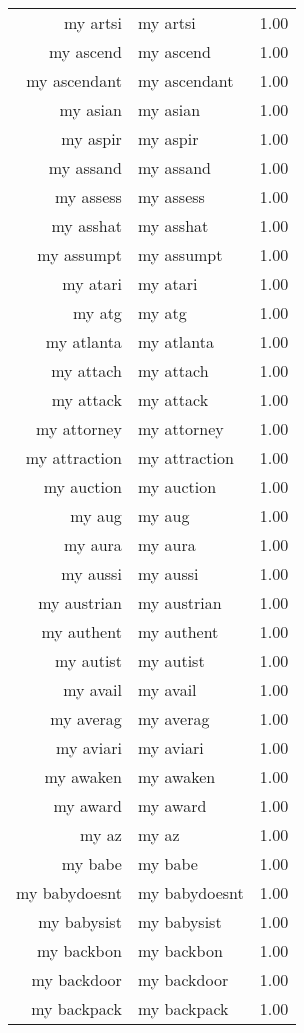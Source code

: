\begin{table}[ht]
\begin{tabular}{rlr}
  my artsi & my artsi & 1.00 \\ 
  my ascend & my ascend & 1.00 \\ 
  my ascendant & my ascendant & 1.00 \\ 
  my asian & my asian & 1.00 \\ 
  my aspir & my aspir & 1.00 \\ 
  my assand & my assand & 1.00 \\ 
  my assess & my assess & 1.00 \\ 
  my asshat & my asshat & 1.00 \\ 
  my assumpt & my assumpt & 1.00 \\ 
  my atari & my atari & 1.00 \\ 
  my atg & my atg & 1.00 \\ 
  my atlanta & my atlanta & 1.00 \\ 
  my attach & my attach & 1.00 \\ 
  my attack & my attack & 1.00 \\ 
  my attorney & my attorney & 1.00 \\ 
  my attraction & my attraction & 1.00 \\ 
  my auction & my auction & 1.00 \\ 
  my aug & my aug & 1.00 \\ 
  my aura & my aura & 1.00 \\ 
  my aussi & my aussi & 1.00 \\ 
  my austrian & my austrian & 1.00 \\ 
  my authent & my authent & 1.00 \\ 
  my autist & my autist & 1.00 \\ 
  my avail & my avail & 1.00 \\ 
  my averag & my averag & 1.00 \\ 
  my aviari & my aviari & 1.00 \\ 
  my awaken & my awaken & 1.00 \\ 
  my award & my award & 1.00 \\ 
  my az & my az & 1.00 \\ 
  my babe & my babe & 1.00 \\ 
  my babydoesnt & my babydoesnt & 1.00 \\ 
  my babysist & my babysist & 1.00 \\ 
  my backbon & my backbon & 1.00 \\ 
  my backdoor & my backdoor & 1.00 \\ 
  my backpack & my backpack & 1.00 \\ 

\end{tabular}
\end{table}
